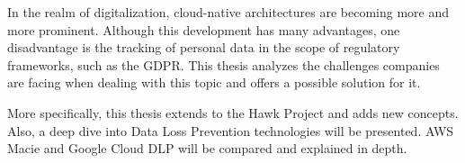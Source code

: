 
\ifCLASSINFOlangDE
{}
\fi

\begin{abstracts}        %

In the realm of digitalization, cloud-native architectures are becoming more and more prominent. Although this development has many advantages, one disadvantage is the tracking of personal data in the scope of regulatory frameworks, such as the GDPR.
This thesis analyzes the challenges companies are facing when dealing with this topic and offers a possible solution for it.


More specifically, this thesis extends to the Hawk Project and adds new concepts. Also, a deep dive into Data Loss Prevention technologies will be presented. AWS Macie and Google Cloud DLP will be compared and explained in depth.

\end{abstracts}
\ifCLASSINFOlangDE
{}
\fi

